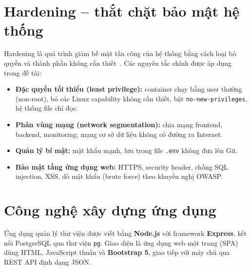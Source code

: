 \documentclass[../main.tex]{subfiles}
\begin{document}
\section{Hardening -- thắt chặt bảo mật hệ thống}
Hardening là quá trình giảm bề mặt tấn công của hệ thống bằng cách loại bỏ quyền và thành phần không cần thiết~\cite{cis-docker,owasp-top10}. Các nguyên tắc chính được áp dụng trong đề tài:
\begin{itemize}
    \item \textbf{Đặc quyền tối thiểu (least privilege):} container chạy bằng user thường (non-root), bỏ các Linux capability không cần thiết, bật \texttt{no-new-privileges}, hệ thống file chỉ đọc.
    \item \textbf{Phân vùng mạng (network segmentation):} chia mạng frontend, backend, monitoring; mạng cơ sở dữ liệu không có đường ra Internet.
    \item \textbf{Quản lý bí mật:} mật khẩu mạnh, lưu trong file \texttt{.env} không đưa lên Git.
    \item \textbf{Bảo mật tầng ứng dụng web:} HTTPS, security header, chống SQL injection, XSS, dò mật khẩu (brute force) theo khuyến nghị OWASP.
\end{itemize}

\section{Công nghệ xây dựng ứng dụng}
Ứng dụng quản lý thư viện được viết bằng \textbf{Node.js} với framework \textbf{Express}, kết nối PostgreSQL qua thư viện \texttt{pg}. Giao diện là ứng dụng web một trang (SPA) dùng HTML, JavaScript thuần và \textbf{Bootstrap 5}, giao tiếp với máy chủ qua REST API định dạng JSON.
\end{document}
